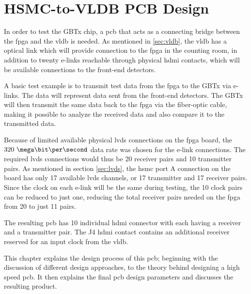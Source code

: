 \documentclass[main.tex]{subfiles}
\begin{document}
\chapter{HSMC-to-VLDB PCB Design} \label{chap:pcb}

In order to test the GBTx chip, a \gls{pcb} that acts as a connecting bridge between the \gls{fpga} and the \gls{vldb} is needed. As mentioned in \ref{sec:vldb}, the \gls{vldb} has a optical link which will provide connection to the \gls{fpga} in the counting room, in addition to twenty e-links reachable through physical \acrshort{hdmi} contacts, which will be available connections to the front-end detectors.

A basic test example is to transmit test data from the \gls{fpga} to the GBTx via e-links. The data will represent data sent from the front-end detectors. The GBTx will then transmit the same data back to the \gls{fpga} via the fiber-optic cable, making it possible to analyze the received data and also compare it to the transmitted data.


Because of limited available physical \gls{lvds} connections on the \gls{fpga} board, the $320~\mega\bit\per\second$ data rate was chosen for the e-link connections. The required \gls{lvds} connections would thus be 20 receiver pairs and 10 transmitter pairs. As mentioned in section \ref{sec:lvds}, the \gls{hsmc} port A connection on the board has only 17 available \gls{lvds} channels, or 17 transmitter and 17 receiver pairs. Since the clock on each e-link will be the same during testing, the 10 clock pairs can be reduced to just one, reducing the total receiver pairs needed on the \gls{fpga} from 20 to just 11 pairs.  

The resulting \acrshort{pcb} has 10 individual \gls{hdmi} connector with each having a receiver and a transmitter pair. The J4 \gls{hdmi} contact contains an additional receiver reserved for an input clock from the \gls{vldb}. 

This chapter explains the design process of this \acrshort{pcb}; beginning with the discussion of different design approaches, to the theory behind designing a high speed \acrshort{pcb}. It then explains the final \acrshort{pcb} design parameters and discusses the resulting product.\\
\end{document}
